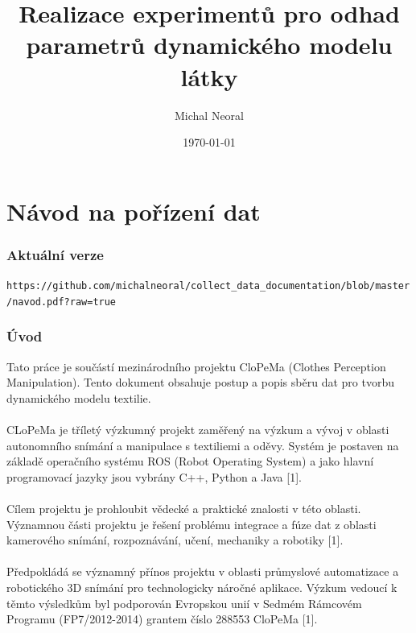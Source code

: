 \documentclass[10pt,a4paper,titlepage,oneside]{book}
\begin{document}
\title{Realizace experimentů pro odhad parametrů dynamického modelu látky}
\author{Michal Neoral}
\date{\today{}}
\maketitle

\thispagestyle{fancy}

\part*{Návod na pořízení dat}

\section*{Aktuální verze}
\verb|https://github.com/michalneoral/collect_data_documentation/blob/master/navod.pdf?raw=true|\\

\section*{Úvod}

Tato práce je součástí mezinárodního projektu CloPeMa (Clothes Perception Manipulation). Tento dokument obsahuje postup a popis sběru dat pro tvorbu dynamického modelu textilie.\\
\\
CLoPeMa je tříletý výzkumný projekt zaměřený na výzkum a vývoj v oblasti autonomního snímání a manipulace s textiliemi a oděvy. Systém je postaven na základě operačního systému ROS (Robot Operating System) a jako hlavní programovací jazyky jsou vybrány C++, Python a Java [1].\\
\\
Cílem projektu je prohloubit vědecké a praktické znalosti v této oblasti. Významnou části projektu je řešení problému integrace a fúze dat z oblasti kamerového snímání, rozpoznávání, učení, mechaniky a robotiky [1].\\
\\
Předpokládá se významný přínos projektu v oblasti průmyslové automatizace a robotického 3D snímání pro technologicky náročné aplikace. Výzkum vedoucí k těmto výsledkům byl podporován Evropskou unií v Sedmém Rámcovém Programu (FP7/2012-2014) grantem číslo 288553 CloPeMa [1].\\
\\
\end{document}
